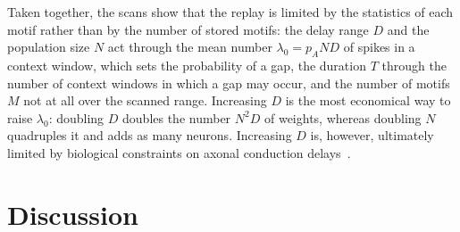 \documentclass{scrartcl}
\newcommand{\citep}[1]{\parencite{#1}}
\begin{document}

Taken together, the scans show that the replay is limited by the statistics of each motif rather than by the number of stored motifs: the delay range $D$ and the population size $N$ act through the mean number $\lambda_0 = p_A N D$ of spikes in a context window, which sets the probability of a gap, the duration $T$ through the number of context windows in which a gap may occur, and the number of motifs $M$ not at all over the scanned range. Increasing $D$ is the most economical way to raise $\lambda_0$: doubling $D$ doubles the number $N^2 D$ of weights, whereas doubling $N$ quadruples it and adds as many neurons. Increasing $D$ is, however, ultimately limited by biological constraints on axonal conduction delays~\citep{Grimaldi2023a}.

\section{Discussion}

\subsection{\ShortTitle}
\end{document}
